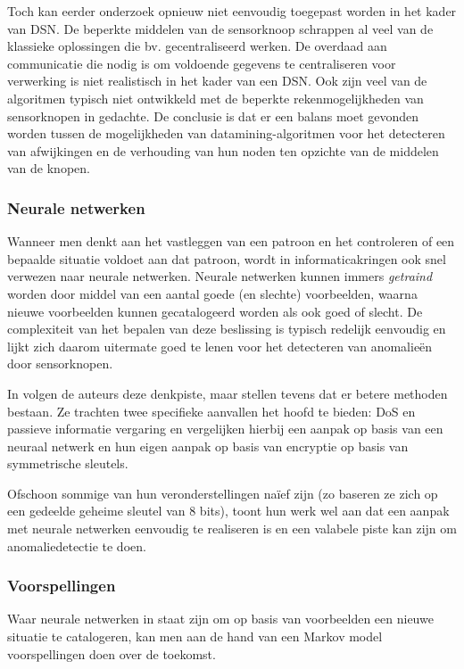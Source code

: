 Toch kan eerder onderzoek opnieuw niet eenvoudig toegepast worden in het kader
van DSN. De beperkte middelen van de sensorknoop schrappen al veel van de
klassieke oplossingen die bv. gecentraliseerd werken. De overdaad aan
communicatie die nodig is om voldoende gegevens te centraliseren voor
verwerking is niet realistisch in het kader van een DSN. Ook zijn veel van de
algoritmen typisch niet ontwikkeld met de beperkte rekenmogelijkheden van
sensorknopen in gedachte. De conclusie is dat er een balans moet gevonden
worden tussen de mogelijkheden van datamining-algoritmen voor het detecteren
van afwijkingen en de verhouding van hun noden ten opzichte van de middelen van
de knopen.

\subsubsection*{Neurale netwerken}
\label{subsubsection:neuralnetworks}

Wanneer men denkt aan het vastleggen van een patroon en het controleren of een
bepaalde situatie voldoet aan dat patroon, wordt in informaticakringen ook snel
verwezen naar neurale netwerken. Neurale netwerken kunnen immers
\emph{getraind} worden door middel van een aantal goede (en slechte)
voorbeelden, waarna nieuwe voorbeelden kunnen gecatalogeerd worden als ook goed
of slecht. De complexiteit van het bepalen van deze beslissing is typisch
redelijk eenvoudig en lijkt zich daarom uitermate goed te lenen voor het
detecteren van anomalie\"en door sensorknopen.

In \citep{ramesh2012wireless} volgen de auteurs deze denkpiste, maar stellen
tevens dat er betere methoden bestaan. Ze trachten twee specifieke aanvallen
het hoofd te bieden: DoS en passieve informatie vergaring en vergelijken
hierbij een aanpak op basis van een neuraal netwerk en hun eigen aanpak op
basis van encryptie op basis van symmetrische sleutels.

Ofschoon sommige van hun veronderstellingen na\"ief zijn (zo baseren ze zich op
een gedeelde geheime sleutel van 8 bits), toont hun werk wel aan dat een aanpak
met neurale netwerken eenvoudig te realiseren is en een valabele piste kan zijn
om anomaliedetectie te doen.

\subsubsection*{Voorspellingen}
\label{subsubsection:predictions}

Waar neurale netwerken in staat zijn om op basis van voorbeelden een nieuwe
situatie te catalogeren, kan men aan de hand van een Markov model
voorspellingen doen over de toekomst.

